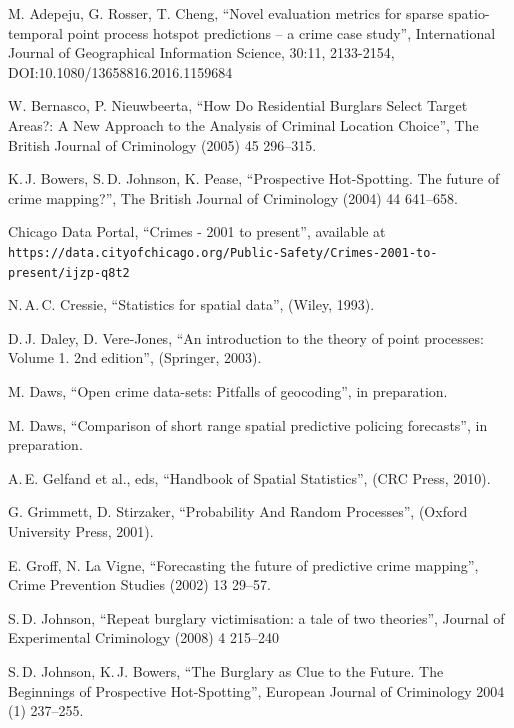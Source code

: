 \documentclass[twoside,a4paper]{article}
\theoremstyle{plain}
\theoremstyle{definition}
\begin{document}
\begin{thebibliography}{99}

 M. Adepeju, G. Rosser, T. Cheng,
	``Novel evaluation metrics for sparse spatio-temporal point process hotspot predictions -- a crime case study'', International Journal of Geographical Information Science, 30:11, 2133-2154, DOI:10.1080/13658816.2016.1159684

 W. Bernasco, P. Nieuwbeerta,
	``How Do Residential Burglars Select Target Areas?: A New Approach to the Analysis of Criminal Location Choice'',
	The British Journal of Criminology (2005) 45 296--315.

 K.\,J. Bowers, S.\,D. Johnson, K. Pease,
	``Prospective Hot-Spotting.  The future of crime mapping?'',
	The British Journal of Criminology (2004) 44 641--658.

 Chicago Data Portal, ``Crimes - 2001 to present'', available at
   \texttt{https://data.cityofchicago.org/Public-Safety/Crimes-2001-to-present/ijzp-q8t2}

 N.\,A.\,C. Cressie,
	``Statistics for spatial data'',
	(Wiley, 1993).

 D.\,J. Daley, D. Vere-Jones,
	``An introduction to the theory of point processes: Volume 1. 2nd edition'',
	(Springer, 2003).

 M. Daws, ``Open crime data-sets: Pitfalls of geocoding'',
	in preparation.

 M. Daws, ``Comparison of short range spatial predictive policing forecasts'',
	in preparation.


 A.\,E. Gelfand et al., eds,
	``Handbook of Spatial Statistics'',
	(CRC Press, 2010).

 G. Grimmett, D. Stirzaker, ``Probability And Random Processes'',
     (Oxford University Press, 2001).

 E. Groff, N. La Vigne,
	``Forecasting the future of predictive crime mapping'',
    Crime Prevention Studies (2002) 13 29--57.

 S.\,D. Johnson,
	``Repeat burglary victimisation: a tale of two theories'',
	Journal of Experimental Criminology (2008) 4 215--240
	
 S.\,D. Johnson, K.\,J. Bowers,
	``The Burglary as Clue to the Future. The Beginnings of Prospective Hot-Spotting'',
	European Journal of Criminology 2004 (1) 237--255.
	

\end{thebibliography}
\end{document}
